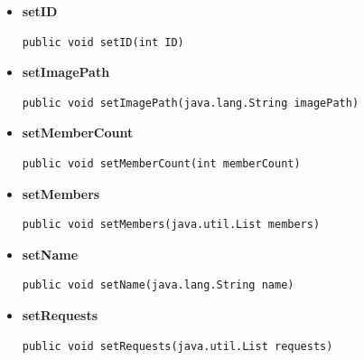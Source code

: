 \documentclass[11pt,a4paper]{report}
\begin{document}
{{{{{\begin{itemize}
{
\hypertarget{edu.kit.pse17.go_app.PersistenceLayer.GroupEntity.setDescription(java.lang.String)}{{\bf  setDescription}\\}
\begin{lstlisting}[frame=none]
public void setDescription(java.lang.String description)\end{lstlisting} %
}%
\item{ 
\hypertarget{edu.kit.pse17.go_app.PersistenceLayer.GroupEntity.setID(int)}{{\bf  setID}\\}
\begin{lstlisting}[frame=none]
public void setID(int ID)\end{lstlisting} %
}%
\item{ 
\hypertarget{edu.kit.pse17.go_app.PersistenceLayer.GroupEntity.setImagePath(java.lang.String)}{{\bf  setImagePath}\\}
\begin{lstlisting}[frame=none]
public void setImagePath(java.lang.String imagePath)\end{lstlisting} %
}%
\item{ 
\hypertarget{edu.kit.pse17.go_app.PersistenceLayer.GroupEntity.setMemberCount(int)}{{\bf  setMemberCount}\\}
\begin{lstlisting}[frame=none]
public void setMemberCount(int memberCount)\end{lstlisting} %
}%
\item{ 
\hypertarget{edu.kit.pse17.go_app.PersistenceLayer.GroupEntity.setMembers(java.util.List)}{{\bf  setMembers}\\}
\begin{lstlisting}[frame=none]
public void setMembers(java.util.List members)\end{lstlisting} %
}%
\item{ 
\hypertarget{edu.kit.pse17.go_app.PersistenceLayer.GroupEntity.setName(java.lang.String)}{{\bf  setName}\\}
\begin{lstlisting}[frame=none]
public void setName(java.lang.String name)\end{lstlisting} %
}%
\item{ 
\hypertarget{edu.kit.pse17.go_app.PersistenceLayer.GroupEntity.setRequests(java.util.List)}{{\bf  setRequests}\\}
\begin{lstlisting}[frame=none]
public void setRequests(java.util.List requests)\end{lstlisting} %
}%
\end{itemize}
}
}
}}}
\end{document}

